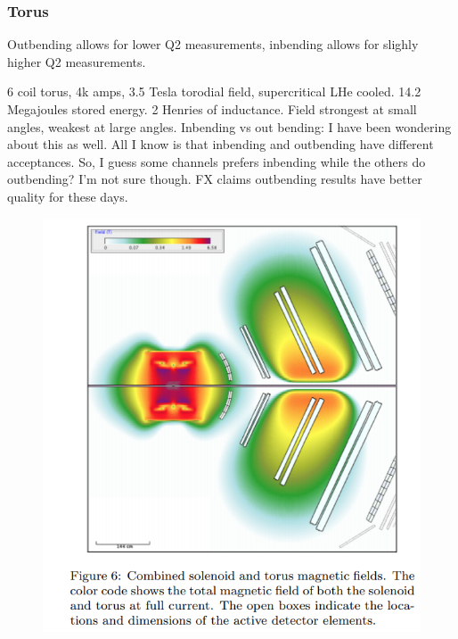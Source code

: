         
        \subsubsection{Torus}
        Outbending allows for lower Q2 measurements, inbending allows for slighly higher Q2 measurements. 

            6 coil torus, 4k amps, 3.5 Tesla torodial field, supercritical LHe cooled. 14.2 Megajoules stored energy. 2 Henries of inductance. Field strongest at small angles, weakest at large angles. 
              Inbending vs out bending:
        I have been wondering about this as well. All I know is that inbending and outbending have different acceptances.
        So, I guess some channels prefers inbending while the others do outbending? I’m not sure though. FX claims outbending results have better quality for these days. 
            									
			 \begin{figure}[H]
    			\centering
    			\includegraphics[width=12cm]{Chapters/Ch2-Experiment/clas-12-exp/clas-detectors/fd/pics/torus.png}
			\end{figure}
                        

        
